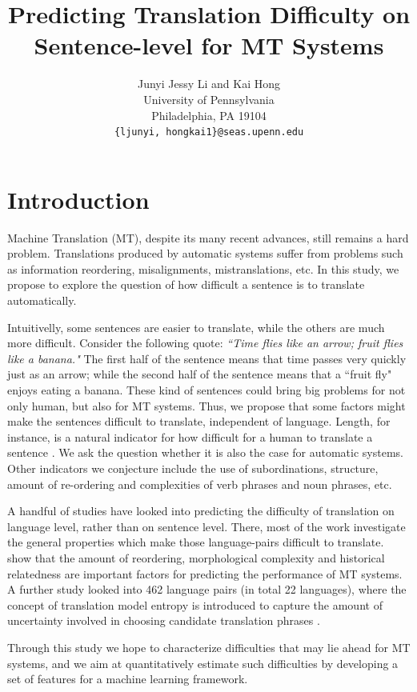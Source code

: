 \documentclass[11pt]{article}
\title{Predicting Translation Difficulty on Sentence-level for MT Systems}
\author{
	Junyi Jessy Li and Kai Hong\\
   University of Pennsylvania \\
   Philadelphia, PA 19104 \\
  	{\tt \{ljunyi, hongkai1\}@seas.upenn.edu}}
\begin{document}
\maketitle

\section{Introduction}

Machine Translation (MT), despite its many recent advances, still remains a hard problem. 
Translations produced by automatic systems suffer from problems such as information reordering, misalignments, mistranslations, etc. 
In this study, we propose to explore the question of how difficult a sentence is to translate automatically. 

Intuitivelly, some sentences are easier to translate, while the others are much more difficult.
Consider the following quote: {\em ``Time flies like an arrow; fruit flies like a banana."}
The first half of the sentence means that time passes very quickly just as an arrow; while the second half of the sentence means that a ``fruit fly" enjoys eating a banana.
These kind of sentences could bring big problems for not only human, but also for MT systems. 
Thus, we propose that some factors might make the sentences difficult to translate, independent of language. Length, for instance, is a natural indicator for how difficult for a human to translate a sentence \cite{mishra-bhattacharyya-carl:2013:Short}. We ask the question whether it is also the case for automatic systems. Other indicators we conjecture include the use of subordinations, structure, amount of re-ordering and complexities of verb phrases and noun phrases, etc.

A handful of studies have looked into predicting the difficulty of translation on language level, rather than on sentence level. There, most of the work investigate the general properties which make those language-pairs difficult to translate.  show that the amount of reordering, morphological complexity and historical relatedness are important factors for predicting the performance of MT systems. A further study looked into 462 language pairs (in total 22 languages), where the concept of translation model entropy is introduced to capture the amount of uncertainty involved in choosing candidate translation phrases \cite{sys462}.

Through this study we hope to characterize difficulties that may lie ahead for MT systems, and we aim at quantitatively estimate such difficulties by developing a set of features for a machine learning framework.
\end{document}
